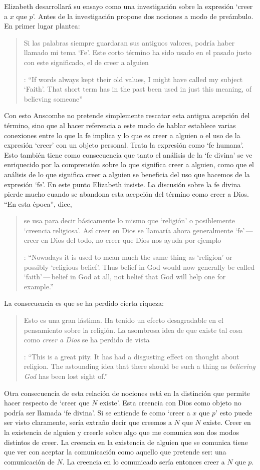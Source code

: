 Elizabeth desarrollará su ensayo como una investigación sobre la expresión \enquote*{creer a $x$ que $p$}. Antes de la investigación propone dos nociones a modo de preámbulo. En primer lugar plantea: \blockquote[{\cite[1]{anscombe2008faith:tobelieve}}: \enquote{If words always kept their old values, I might have called my subject `Faith'. That short term has in the past been used in just this meaning, of believing someone}]{Si las palabras siempre guardaran sus antiguos valores, podría haber llamado mi tema `Fe'. Este corto término ha sido usado en el pasado justo con este significado, el de creer a alguien}. Con esto Anscombe no pretende simplemente rescatar esta antigua acepción del término, sino que al hacer referencia a este modo de hablar establece varias conexiones entre lo que la fe implica y lo que es creer a alguien o el uso de la expresión `creer' con un objeto personal. Trata la expresión como `fe humana'. Esto también tiene como consecuencia que tanto el análisis de la `fe divina' se ve enriquecido por la comprensión sobre lo que significa creer a alguien, como que el análisis de lo que significa creer a alguien se beneficia del uso que hacemos de la expresión `fe'. En este punto Elizabeth insiste. La discusión sobre la fe divina pierde mucho cuando se abandona esta acepción del término como creer a Dios. \enquote{En esta época}, dice, \blockquote[{\cite{anscombe2008faith:tobelieve}}: \enquote{Nowadays it is used to mean much the same thing as `religion' or possibly `religious belief'. Thus belief in God would now generally be called `faith'\,---\,belief in God at all, not belief that God will help one for example.}]{se usa para decir básicamente lo mismo que `religión' o posiblemente `creencia religiosa'. Así creer en Dios se llamaría ahora generalmente `fe'\,---\,creer en Dios del todo, no creer que Dios nos ayuda por ejemplo}. La consecuencia es que se ha perdido cierta riqueza: \blockquote[{\cite{anscombe2008faith:tobelieve}}: \enquote{This is a great pity. It has had a disgusting effect on thought about religion. The astounding idea that there should be such a thing as \emph{believing God} has been lost sight of.}]{Esto es una gran lástima. Ha tenido un efecto desagradable en el pensamiento sobre la religión. La asombrosa idea de que existe tal cosa como \emph{creer a Dios} se ha perdido de vista}.

Otra consecuencia de esta relación de nociones está en la distinción que permite hacer respecto de \enquote*{creer que $N$ existe}. Esta creencia con Dios como objeto no podría ser llamada `fe divina'. Si se entiende fe como \enquote*{creer a $x$ que $p$} esto puede ser visto claramente, sería extraño decir que creemos a $N$ que $N$ existe. Creer en la existencia de alguien y creerle sobre algo que me comunica son dos modos distintos de creer. La creencia en la existencia de alguien que se comunica tiene que ver con aceptar la comunicación como aquello que pretende ser: una comunicación de $N$. La creencia en lo comunicado sería entonces creer a $N$ que $p$.

